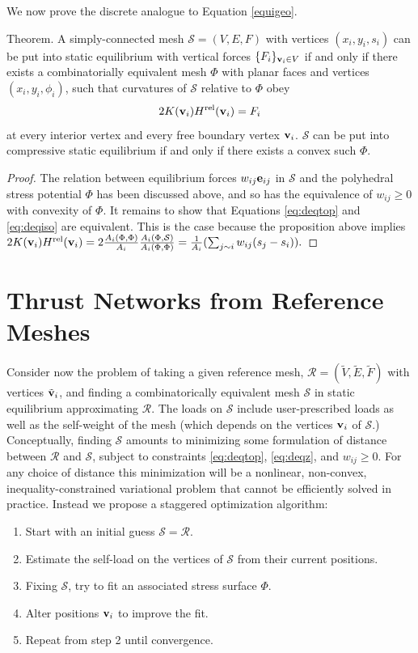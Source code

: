 \documentclass[annual]{acmsiggraph}
\def\rel{{\mathord{\text{\rm rel}}}}
\def\SS{{\mathcal S}}
\def\RR{{\mathcal R}}
\begin{document}
We now prove the discrete analogue to Equation \eqref{equigeo}.

\proclaim Theorem.
 A simply-connected mesh $\SS=(V,E,F)$ with vertices $(x_i,y_i,s_i)$ can 
be put into static equilibrium with vertical forces $\{F_i\}_{{\mathbf v}_i\in V}$ 
if and only if there exists a combinatorially equivalent mesh $\Phi$ with 
planar faces and vertices $(x_i,y_i,\phi_i)$, such that curvatures of 
$\SS$ relative to $\Phi$ obey
	\begin{equation}
	2 K(\vw_i) H^\rel(\vw_i) = F_i
	\label{eq:deqiso}
	\end{equation}
 at every interior vertex and every free boundary vertex ${\mathbf v}_i$. $\SS$ 
can be put into compressive static equilibrium if and only if there exists 
a convex such $\Phi$.

\begin{proof} The relation between equilibrium forces $w_{ij}{\mathbf e}_{ij}$ in 
$\SS$ and the polyhedral stress potential $\Phi$ has been discussed above, 
and so has the equivalence of $w_{ij}\ge 0$ with convexity of $\Phi$. It 
remains to show that Equations \eqref{eq:deqtop} and \eqref{eq:deqiso} are 
equivalent. This is the case because the proposition above implies
	$
	2 K(\vw_i) H^\rel(\vw_i) = 
	2 \frac{A_i(\Phi,\Phi)}{A_i}
	\frac{A_i(\Phi,\SS)}{A_i(\Phi,\Phi)} = 
	{1\over A_i}
	(\sum_{j\sim i} w_{ij} (s_j-s_i)).
	$
	\end{proof}


\section{Thrust Networks from Reference Meshes} \label{sec:opt} 
Consider now the problem of taking a given reference mesh, $\RR = (\tilde{V},\tilde{E},\tilde{F})$ with vertices $\tilde{{\mathbf v}}_i$, and finding
a combinatorically equivalent mesh $\SS$ in static equilibrium approximating $\RR$.
The loads on $\SS$ include user-prescribed 
loads as well as the self-weight of the mesh (which depends 
on the vertices ${\mathbf v}_i$ of $\SS$.) Conceptually, finding $\SS$ amounts to 
minimizing some formulation of distance between $\RR$ and $\SS$, subject to constraints 
\eqref{eq:deqtop}, \eqref{eq:deqz}, and $w_{ij} \geq 0$. For any choice of distance this minimization will be a nonlinear, 
non-convex, inequality-constrained variational problem that cannot be 
efficiently solved in practice. Instead we propose a staggered optimization algorithm:

\begin{enumerate}\itemsep-\parsep
\item Start with an initial guess $\SS = \RR$.
\item Estimate the self-load on the vertices of $\SS$ from their current positions.
\item Fixing $\SS$, try to fit an associated stress surface $\Phi$.
\item Alter positions ${\mathbf v}_i$ to improve the fit.
\item Repeat from step 2 until convergence.
\end{enumerate}
\end{document}
